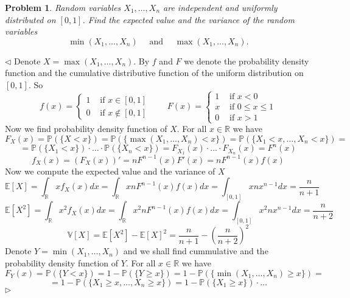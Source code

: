 \documentclass[12pt]{article}
\newtheorem{problem}{Problem}[subsection]
\newenvironment{solution}{\par $\triangleleft$}{$\triangleright$}
\begin{document}
\begin{problem} Random variables $X_1,\ldots,X_n$ are independent and uniformly
distributed on $[0,1]$. Find the expected value and the variance of the random
variables
$$
    \min(X_1,\ldots,X_n)\quad\mbox{ and }\quad \max(X_1,\ldots,X_n).
$$
\end{problem}
\begin{solution} Denote $X=\max(X_1,\ldots,X_n)$. By $f$ and $F$ we denote the
    probability density function and the cumulative distributive function of the
    uniform distribution on $[0,1]$. So
    $$
        f(x)=\begin{cases}
            1 &
            \mbox{ if } x\in[0,1] \\
            0 &
            \mbox{ if }x\notin[0,1]
        \end{cases}\qquad
        F(x)=\begin{cases}
            1 &
            \mbox{ if } x<0           \\
            x &
            \mbox{ if } 0\leq x\leq 1 \\
            0 &
            \mbox{ if } x>1
        \end{cases}
    $$
    Now we find probability density function of $X$. For all $x\in\mathbb{R}$ we
    have
    $$
        F_X(x)=\mathbb{P}(\{X<x\})
        =\mathbb{P}(\{\max(X_1,\ldots,X_n)<x\})
        =\mathbb{P}(\{X_1<x,\ldots,X_n<x\})=
    $$
    $$
        =\mathbb{P}(\{X_1<x\})\cdot\ldots\cdot\mathbb{P}(\{X_n<x\}) %
        =F_{X_1}(x)\cdot\ldots\cdot F_{X_n}(x)=F^n(x)  %
    $$
    $$
        f_X(x)=(F_X(x))'=n F^{n-1}(x)F'(x)=nF^{n-1}(x)f(x)
    $$
    Now we compute the expected value and the variance of $X$
    $$
        \mathbb{E}[X]=\int_{\mathbb{R}}xf_X(x)dx
        =\int_{\mathbb{R}}xnF^{n-1}(x)f(x)dx
        =\int_{[0,1]}xnx^{n-1}dx=\frac{n}{n+1}
    $$
    $$
        \mathbb{E}[X^2]=\int_{\mathbb{R}}x^2f_X(x)dx
        =\int_{\mathbb{R}}x^2nF^{n-1}(x)f(x)dx
        =\int_{[0,1]}x^2nx^{n-1}dx=\frac{n}{n+2}
    $$
    $$
        \mathbb{V}[X]=\mathbb{E}[X^2]-{\mathbb{E}[X]}^2
        =\frac{n}{n+1}-{\left(\frac{n}{n+2}\right)}^2
    $$
    Denote $Y=\min(X_1,\ldots,X_n)$ and we shall find cummulative and the
    probability density function of $Y$. For all $x\in\mathbb{R}$ we have
    $$
        F_Y(x)=\mathbb{P}(\{Y<x\})
        =1-\mathbb{P}(\{Y\geq x\})
        =1-\mathbb{P}(\{\min(X_1,\ldots,X_n)\geq x\})=
    $$
    $$
        =1-\mathbb{P}(\{X_1\geq x,\ldots,X_n\geq x\})=
        1-\mathbb{P}(\{X_1\geq x\})\cdot
        \ldots
$$
\end{solution}
\end{document}

